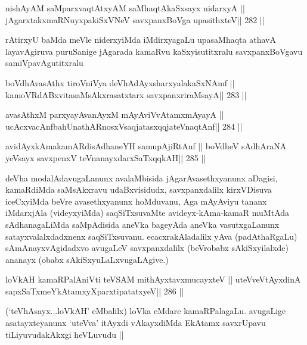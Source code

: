 \begin{shl}
nishAyAM saMparxvaqtAtxyAM saMhaqtAkaSxsayx nidarxyA ||
jAgarxtakxmaRNuyxpakiSxVNeV savxpanxBoVga upasithxteV\hfill || 282 ||
\end{shl}

\begin{artha}
rAtirxyU baMda meVle niderxyiMda iMdirxyagaLu upasaMhaqta athavA layavAgiruva puruSanige jAgarada kamaRvu kaSxyisutitxralu savxpanxBoVgavu samiVpavAgutitxralu 
\end{artha}

\begin{shl}
boVdhAvasAthx tiroVniVya deVhAdAyxsharxyalakaSxNAmf ||
kamoVRdABxvitasaMsAkxrasatxtarx savxpanxriraMsayA\hfill || 283 ||
\end{shl}

\begin{shl}
avasAthxM parxyayAvanAyxM mAyAviVvA\s\s tamxmAyayA ||
ucAcxvacAnfbahUnathARnosxV\s saqjatasxqqjateV\s naqtAnf\hfill || 284 ||
\end{shl}

\begin{shl}
avidAyxkAmakamARdisAdhaneYH samupAjiRtAnf ||
boVdheV sAdhAraNA yeV\s sayx savxpenxV teV\s nanayxdarxSaTxqqkAH\hfill || 285 ||
\end{shl}

\begin{artha}
deVha modalAdavugaLanunx avalaMbisida jAgarAvasethxyanunx aDagisi, 
kamaRdiMda saMsAkxravu udaBxvisidudx, savxpanxdalilx kirxVDisuva 
iceCxyiMda beVre avasethxyanunx hoMduvanu, Aga mAyAviyu tananx 
iMdarxjAla (videyxyiMda) saqSiTxsuvaMte avideyx-kAma-kamaR muMtAda sAdhanagaLiMda saMpAdisida aneVka bageyAda aneVka vasutxgaLanunx satayxvalalxdadxnenx saqSiTxsuvanu. ecacxrakAladalilx yAva (padAthaRgaLu) sAmAnayxvAgidadxvo avugaLeV savxpanxdalilx (beVrobabx sAkiSxyilalxde) ananayx (obabx sAkiSxyuLaLxvugaLAgive.)
\end{artha}

\begin{shl}
loVkAH kamaRPalAniVti teVSAM mithAyxtavxmucayxteV ||
uteVveVtAyxdinA sapxSaTxmeYkAtamxyXparxtipatatxyeV\hfill || 286 ||
\end{shl}

\begin{artha}
(`teVhAsayx...loVkAH' eMbalilx) loVka eMdare kamaRPalagaLu. avugaLige 
asatayxteyanunx `uteVva' itAyxdi vAkayxdiMda EkAtamx savxrUpavu tiLiyuvudakAkxgi heVLuvudu ||
\end{artha}

